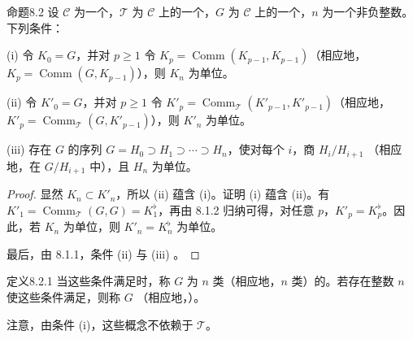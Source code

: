 \begin{SGAresult}{命题}{8.2}
设 $\mathscr C$ 为一个，$\mathscr T$ 为 $\mathscr C$ 上的一个，$G$ 为 $\mathscr C$ 上的一个，$n$ 为一个非负整数。下列条件：

(i) 令 $K_0=G$，并对 $p\geq1$ 令 $K_p=\operatorname{Comm}(K_{p-1},K_{p-1})$（相应地，$K_p=\operatorname{Comm}(G,K_{p-1})$），则 $K_n$ 为单位。

(ii) 令 $K'_0=G$，并对 $p\geq1$ 令 $K'_p=\operatorname{Comm}_{\mathscr T}(K'_{p-1},K'_{p-1})$（相应地，$K'_p=\operatorname{Comm}_{\mathscr T}(G,K'_{p-1})$），则 $K'_n$ 为单位。

(iii) 存在 $G$ 的序列 $G=H_0\supset H_1\supset\cdots\supset H_n$，使对每个 $i$，商 $H_i/H_{i+1}$ （相应地，在 $G/H_{i+1}$ 中），且 $H_n$ 为单位。
\end{SGAresult}
\begin{proof}
显然 $K_n\subset K'_n$，所以 (ii) 蕴含 (i)。证明 (i) 蕴含 (ii)。有 $K'_1=\operatorname{Comm}_{\mathscr T}(G,G)=K_1^\flat$，再由 8.1.2 归纳可得，对任意 $p$，$K'_p=K_p^\flat$。因此，若 $K_n$ 为单位，则 $K'_n=K_n^\flat$ 为单位。

最后，由 8.1.1，条件 (ii) 与 (iii) 。
\end{proof}

\begin{SGAresult}{定义}{8.2.1}
当这些条件满足时，称 $G$ 为 $n$ 类（相应地，$n$ 类）的。若存在整数 $n$ 使这些条件满足，则称 $G$ （相应地，）。
\end{SGAresult}
注意，由条件 (i)，这些概念不依赖于 $\mathscr T$。

